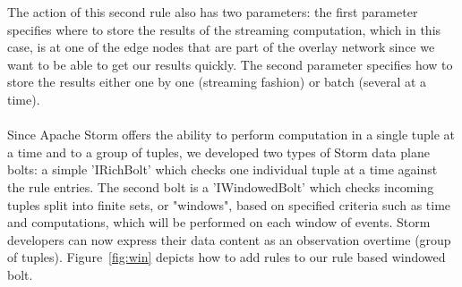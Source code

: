 The action of this second rule also has two parameters: the first parameter specifies where to store the results of the streaming computation, which in this case, is at one of the edge nodes that are part of the overlay network since we want to be able to get our results quickly. The second parameter specifies how to store the results either one by one (streaming fashion) or batch (several at a time).
\\
\\
Since Apache Storm offers the ability to perform computation in a single tuple at a time and to a group of tuples, we developed two types of Storm data plane bolts: a simple 'IRichBolt' which checks one individual tuple at a time against the rule entries. The second bolt is a 'IWindowedBolt' which checks incoming tuples split into finite sets, or "windows", based on specified criteria such as time and computations, which will be performed on each window of events. Storm developers can now express their data content as an observation overtime (group of tuples). Figure~\ref{fig:win} depicts how to add rules to our rule based windowed bolt.





